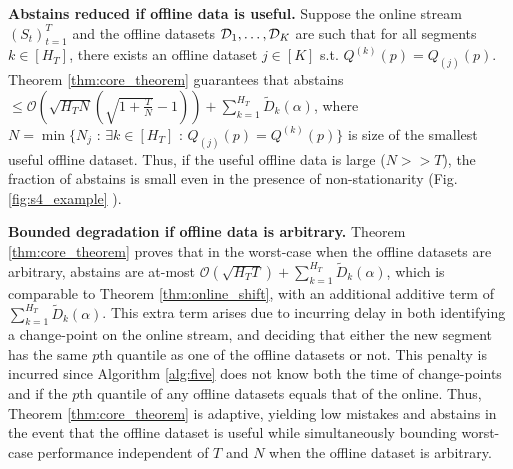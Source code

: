 
\textbf{Abstains reduced if offline data is useful.}
     Suppose the online stream $(S_t)_{t=1}^T$  and the offline datasets  ${\mathcal{D}}_{1}, \ldots, {\mathcal{D}}_K$ are such that for all segments $k \in [H_T]$, there exists an offline dataset $j \in [K]$ s.t. $Q^{(k)}(p) = Q_{(j)}(p)$. Theorem \ref{thm:core_theorem} guarantees that  abstains $\leq \mathcal{O}\left(\sqrt{H_T N} \left(\sqrt{1+\frac{T}{N}} - 1 \right)\right) + \sum_{k=1}^{H_T}\widetilde{D}_k( \alpha)$, where $N = \min \{N_j \text{ : } \exists k \in [H_T] \text{ : } Q_{(j)}(p) = Q^{(k)}(p) \}  $ is size of the smallest useful offline dataset. Thus, if the useful offline data is large ($N >> T$), the fraction of abstains is small even in the presence of non-stationarity (Fig. \ref{fig:s4_example} ). 
     

\textbf{Bounded degradation if offline data is arbitrary.}
Theorem \ref{thm:core_theorem} proves that in the worst-case when the offline datasets are arbitrary, abstains are at-most $ \mathcal{O}(\sqrt{H_T T}) + \sum_{k=1}^{H_T}\widetilde{D}_k(\alpha)$, which is comparable to Theorem \ref{thm:online_shift}, with an additional additive term of $\sum_{k=1}^{H_T}\widetilde{D}_k(\alpha)$. This extra term arises due to incurring delay in both identifying a change-point on the online stream, and deciding that either the new segment has the same $p$th quantile as one of the offline datasets or not. This penalty is incurred since Algorithm \ref{alg:five} does not know both the time of change-points and if the $p$th quantile of any offline datasets equals that of the online. Thus, Theorem \ref{thm:core_theorem} is adaptive, yielding low mistakes and abstains in the event that the offline dataset is useful while simultaneously bounding worst-case performance independent of $T$ and $N$ when the offline dataset is arbitrary. 



